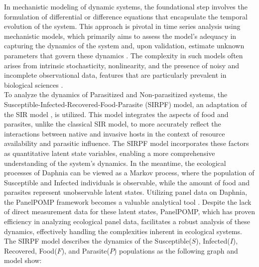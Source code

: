 \documentclass[12pt]{article}
\begin{document}
In mechanistic modeling of dynamic systems, the foundational step involves the formulation of differential or difference equations that encapsulate the temporal evolution of the system. This approach is pivotal in time series analysis using mechanistic models, which primarily aims to assess the model's adequacy in capturing the dynamics of the system and, upon validation, estimate unknown parameters that govern these dynamics \citep{breto2009time}. The complexity in such models often arises from intrinsic stochasticity, nonlinearity, and the presence of noisy and incomplete observational data, features that are particularly prevalent in biological sciences \citep{wilkinson2018stochastic}.\\

To analyze the dynamics of Parasitized and Non-parasitized systems, the Susceptible-Infected-Recovered-Food-Parasite (SIRPF) model, an adaptation of the SIR model \citep{weiss2013sir}, is utilized. This model integrates the aspects of food and parasites, unlike the classical SIR model, to more accurately reflect the interactions between native and invasive hosts in the context of resource availability and parasitic influence. The SIRPF model incorporates these factors as quantitative latent state variables, enabling a more comprehensive understanding of the system's dynamics. In the meantime, the ecological processes of Daphnia can be viewed as a Markov process, where the population of Susceptible and Infected individuals is observable, while the amount of food and parasites represent unobservable latent states. Utilizing panel data on Daphnia, the PanelPOMP framework becomes a valuable analytical tool \citep{Carles2020}. Despite the lack of direct measurement data for these latent states, PanelPOMP, which has proven efficiency in analyzing ecological panel data, facilitates a robust analysis of these dynamics, effectively handling the complexities inherent in ecological systems.\\

The SIRPF model describes the dynamics of the Susceptible($S$), Infected($I$), Recovered, Food($F$), and Parasite($P$) populations as the following graph and model show: 

\usetikzlibrary{positioning}
\usetikzlibrary {arrows.meta}
\usetikzlibrary{shapes.geometric}
\end{document}
